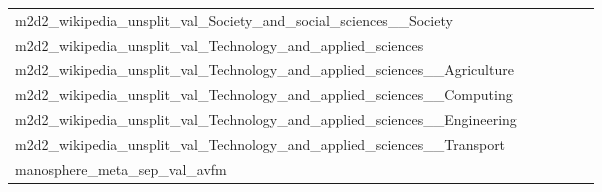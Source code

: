 {\begin{longtable}{m{6cm}m{1.7cm}m{1.7cm}m{1.7cm}m{1.7cm}m{1.7cm}}
	m2d2\_wikipedia\_unsplit\_val\_Society\_and\_social\_sciences\_\_Society  & \colorbox[HTML]{fefee0}{\makebox[\mywidth][c]{12.48}} & \colorbox[HTML]{e9f6af}{\makebox[\mywidth][c]{12.13}} & \colorbox[HTML]{ffffe5}{\makebox[\mywidth][c]{13.02}} & \colorbox[HTML]{daf0a4}{\makebox[\mywidth][c]{12.07}} & \colorbox[HTML]{77c578}{\makebox[\mywidth][c]{11.93}}\\
	m2d2\_wikipedia\_unsplit\_val\_Technology\_and\_applied\_sciences  & \colorbox[HTML]{ffffe5}{\makebox[\mywidth][c]{8.51}} & \colorbox[HTML]{fcfdd5}{\makebox[\mywidth][c]{8.18}} & \colorbox[HTML]{ffffe5}{\makebox[\mywidth][c]{8.66}} & \colorbox[HTML]{b2df90}{\makebox[\mywidth][c]{7.93}} & \colorbox[HTML]{77c578}{\makebox[\mywidth][c]{7.88}}\\
	m2d2\_wikipedia\_unsplit\_val\_Technology\_and\_applied\_sciences\_\_Agriculture  & \colorbox[HTML]{fefee0}{\makebox[\mywidth][c]{12.45}} & \colorbox[HTML]{e5f4ab}{\makebox[\mywidth][c]{12.07}} & \colorbox[HTML]{ffffe5}{\makebox[\mywidth][c]{13.00}} & \colorbox[HTML]{daf0a4}{\makebox[\mywidth][c]{12.03}} & \colorbox[HTML]{77c578}{\makebox[\mywidth][c]{11.88}}\\
	m2d2\_wikipedia\_unsplit\_val\_Technology\_and\_applied\_sciences\_\_Computing  & \colorbox[HTML]{fcfed8}{\makebox[\mywidth][c]{13.62}} & \colorbox[HTML]{e5f4ab}{\makebox[\mywidth][c]{13.23}} & \colorbox[HTML]{ffffe5}{\makebox[\mywidth][c]{14.56}} & \colorbox[HTML]{daf0a4}{\makebox[\mywidth][c]{13.18}} & \colorbox[HTML]{77c578}{\makebox[\mywidth][c]{12.97}}\\
	m2d2\_wikipedia\_unsplit\_val\_Technology\_and\_applied\_sciences\_\_Engineering  & \colorbox[HTML]{fcfed7}{\makebox[\mywidth][c]{13.00}} & \colorbox[HTML]{eef8b2}{\makebox[\mywidth][c]{12.72}} & \colorbox[HTML]{ffffe5}{\makebox[\mywidth][c]{13.87}} & \colorbox[HTML]{dff2a7}{\makebox[\mywidth][c]{12.64}} & \colorbox[HTML]{77c578}{\makebox[\mywidth][c]{12.43}}\\
	m2d2\_wikipedia\_unsplit\_val\_Technology\_and\_applied\_sciences\_\_Transport  & \colorbox[HTML]{fcfed9}{\makebox[\mywidth][c]{14.34}} & \colorbox[HTML]{d3eda0}{\makebox[\mywidth][c]{13.90}} & \colorbox[HTML]{ffffe5}{\makebox[\mywidth][c]{15.20}} & \colorbox[HTML]{ddf1a6}{\makebox[\mywidth][c]{13.94}} & \colorbox[HTML]{77c578}{\makebox[\mywidth][c]{13.73}}\\
	manosphere\_meta\_sep\_val\_avfm  & \colorbox[HTML]{c2e698}{\makebox[\mywidth][c]{19.42}} & \colorbox[HTML]{9ad486}{\makebox[\mywidth][c]{19.27}} & \colorbox[HTML]{ffffe5}{\makebox[\mywidth][c]{21.88}} & \colorbox[HTML]{e6f5ad}{\makebox[\mywidth][c]{19.64}} & \colorbox[HTML]{77c578}{\makebox[\mywidth][c]{19.18}}\\

\end{longtable}}
